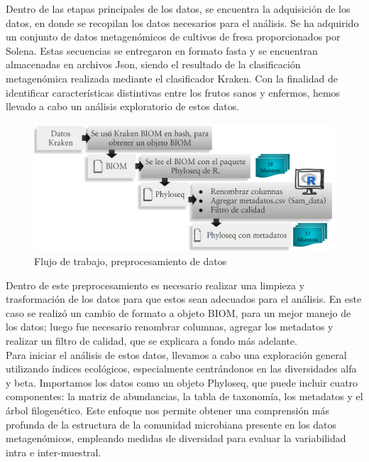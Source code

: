 Dentro de las etapas principales de los datos, se encuentra la adquisición de los datos, en donde se recopilan los datos necesarios para el análisis. Se ha adquirido un conjunto de datos metagenómicos de cultivos de fresa proporcionados por Solena. Estas secuencias se entregaron en formato fasta y se encuentran almacenadas en archivos Json, siendo el resultado de la clasificación metagenómica realizada mediante el clasificador Kraken. Con la finalidad de identificar características distintivas entre los frutos sanos y enfermos, hemos llevado a cabo un análisis exploratorio de estos datos.\\

\begin{figure}[h]
\centering
\includegraphics[width=\textwidth]{Img/cap2/preprosecamiento.png}
\caption{Flujo de trabajo, preprocesamiento de datos}
\end{figure}

Dentro de este preprocesamiento es necesario realizar una limpieza y trasformación de los datos para que estos sean adecuados para el análisis. En este caso se realizó un cambio de formato a objeto BIOM, para un mejor manejo de los datos; luego fue necesario renombrar columnas, agregar los metadatos y realizar un filtro de calidad, que se explicara a fondo más adelante.\\

Para iniciar el análisis de estos datos, llevamos a cabo una exploración general utilizando índices ecológicos, especialmente centrándonos en las diversidades alfa y beta. Importamos los datos como un objeto Phyloseq, que puede incluir cuatro componentes: la matriz de abundancias, la tabla de taxonomía, los metadatos y el árbol filogenético. Este enfoque nos permite obtener una comprensión más profunda de la estructura de la comunidad microbiana presente en los datos metagenómicos, empleando medidas de diversidad para evaluar la variabilidad intra e inter-muestral.\\

